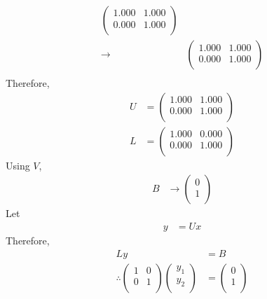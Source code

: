 \documentclass[fleqn, a4paper, 11pt, oneside]{amsart}
\theoremstyle{definition}
\theoremstyle{theorem}
\begin{document}
\begin{solution}
\begin{enumerate}[leftmargin=*]
\begin{align*}
\begin{pmatrix}
						1.000 & 1.000 \\
						0.000 & 1.000 \\
					\end{pmatrix}\\
				\xrightarrow{} &
					\begin{pmatrix}
						1.000 & 1.000 \\
						0.000 & 1.000 \\
					\end{pmatrix}\\
			\end{align*}
			Therefore,
			\begin{align*}
				U &=
					\begin{pmatrix}
						1.000 & 1.000 \\
						0.000 & 1.000 \\
					\end{pmatrix}\\
				L &=
					\begin{pmatrix}
						1.000 & 0.000 \\
						0.000 & 1.000 \\
					\end{pmatrix}
			\end{align*}
			Using $V$,
			\begin{align*}
				B &\to
					\begin{pmatrix}
						0 \\
						1 \\
					\end{pmatrix}
			\end{align*}
			Let
			\begin{align*}
				y & = U x
			\end{align*}
			Therefore,
			\begin{align*}
				L y &= B\\
				\therefore
					\begin{pmatrix}
						1 & 0 \\
						0 & 1 \\
					\end{pmatrix}
					\begin{pmatrix}
						y_1 \\
						y_2 \\
					\end{pmatrix}
				&=
					\begin{pmatrix}
						0 \\
						1 \\
					\end{pmatrix}
			\end{align*}

\end{enumerate}
\end{solution}
\end{document}
